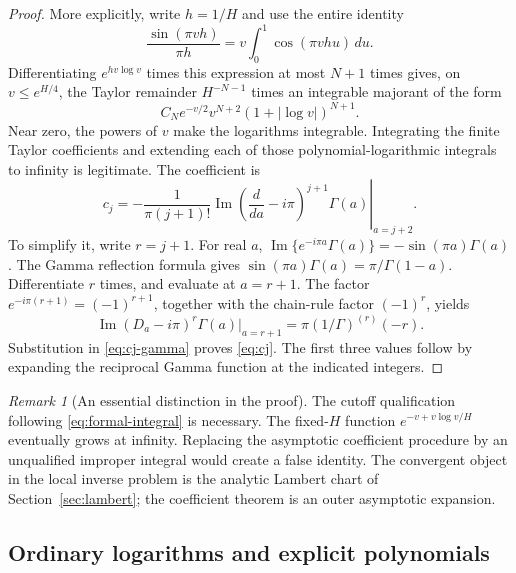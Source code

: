 \documentclass[11pt,a4paper]{article}
\numberwithin{equation}{section}
\theoremstyle{definition}
\theoremstyle{remark}
\newtheorem{remark}[theorem]{Remark}
\DeclareMathOperator{\Ima}{Im}
\newcommand{\dd}{\,d}
\begin{document}
\begin{proof}
More explicitly, write \(h=1/H\) and use the entire identity
\[
 \frac{\sin(\pi vh)}{\pi h}
 =v\int_0^1\cos(\pi vhu)\dd u.
\]
Differentiating \(e^{hv\log v}\) times this expression at most
\(N+1\) times gives, on \(v\le e^{H/4}\), the Taylor remainder
\(H^{-N-1}\) times an integrable majorant
of the form
\[
 C_N e^{-v/2}v^{N+2}(1+|\log v|)^{N+1}.
\]
Near zero, the powers of \(v\) make the logarithms integrable.
Integrating the finite Taylor coefficients and extending each of
those polynomial-logarithmic integrals to infinity is legitimate.
The coefficient is
\begin{equation}
 c_j=-\frac1{\pi(j+1)!}
 \Ima\left.
 \left(\frac{d}{da}-i\pi\right)^{j+1}
 \Gamma(a)\right|_{a=j+2}.
 \label{eq:cj-gamma}
\end{equation}
To simplify it, write \(r=j+1\).
For real \(a\),
\(\Ima\{e^{-i\pi a}\Gamma(a)\}
=-\sin(\pi a)\Gamma(a)\).
The Gamma reflection formula \cite{dlmf-gamma} gives
\(\sin(\pi a)\Gamma(a)=\pi/\Gamma(1-a)\).
Differentiate \(r\) times, and evaluate at \(a=r+1\).
The factor \(e^{-i\pi(r+1)}=(-1)^{r+1}\), together with the
chain-rule factor \((-1)^r\), yields
\[
 \Ima(D_a-i\pi)^r\Gamma(a)\big|_{a=r+1}
 =\pi(1/\Gamma)^{(r)}(-r).
\]
Substitution in \eqref{eq:cj-gamma} proves \eqref{eq:cj}.
The first three values follow by expanding the reciprocal Gamma
function at the indicated integers.
\end{proof}

\begin{remark}[An essential distinction in the proof]
The cutoff qualification following \eqref{eq:formal-integral} is
necessary.  The fixed-\(H\) function
\(e^{-v+v\log v/H}\) eventually grows at infinity.
Replacing the asymptotic coefficient procedure by an unqualified
improper integral would create a false identity.
The convergent object in the local inverse problem is the analytic
Lambert chart of Section~\ref{sec:lambert}; the coefficient theorem is
an outer asymptotic expansion.
\end{remark}

\subsection{Ordinary logarithms and explicit polynomials}
\end{document}
